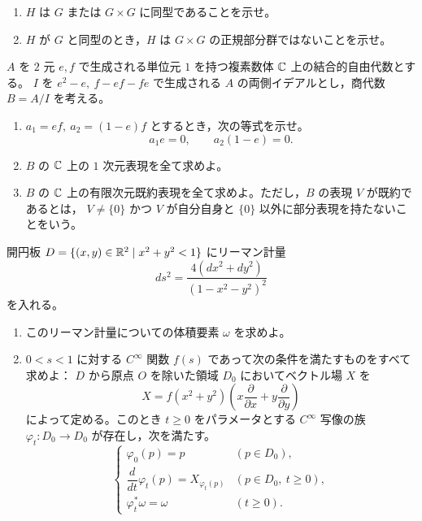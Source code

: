 \begin{enumerate}
  \item \(H\) は \(G\) または \(G\times G\) に同型であることを示せ。
  \item \(H\) が \(G\) と同型のとき，\(H\) は \(G\times G\) の正規部分群ではないことを示せ。
\end{enumerate}


\(A\) を \(2\) 元 \(e,f\) で生成される単位元 \(1\) を持つ複素数体 \(\mathbb{C}\) 上の結合的自由代数とする。
\(I\) を \(e^2-e,\ f-ef-fe\) で生成される \(A\) の両側イデアルとし，商代数 \(B=A/I\) を考える。

\begin{enumerate}
  \item \(a_1=ef,\ a_2=(1-e)f\) とするとき，次の等式を示せ。
  \[
    a_1e=0,\qquad a_2(1-e)=0.
  \]
  \item \(B\) の \(\mathbb{C}\) 上の \(1\) 次元表現を全て求めよ。
  \item \(B\) の \(\mathbb{C}\) 上の有限次元既約表現を全て求めよ。ただし，\(B\) の表現 \(V\) が既約であるとは，
  \(V\ne\{0\}\) かつ \(V\) が自分自身と \(\{0\}\) 以外に部分表現を持たないことをいう。
\end{enumerate}


開円板 \(D=\{(x,y)\in\mathbb{R}^2\mid x^2+y^2<1\}\) にリーマン計量
\[
  ds^2=\frac{4(dx^2+dy^2)}{(1-x^2-y^2)^2}
\]
を入れる。

\begin{enumerate}
  \item このリーマン計量についての体積要素 \(\omega\) を求めよ。
  \item \(0<s<1\) に対する \(C^\infty\) 関数 \(f(s)\) であって次の条件を満たすものをすべて求めよ：
  \(D\) から原点 \(O\) を除いた領域 \(D_0\) においてベクトル場 \(X\) を
  \[
    X=f(x^2+y^2)\left(x\frac{\partial}{\partial x}+y\frac{\partial}{\partial y}\right)
  \]
  によって定める。このとき \(t\ge0\) をパラメータとする \(C^\infty\) 写像の族
  \(\varphi_t:D_0\to D_0\) が存在し，次を満たす。
  \[
  \begin{cases}
    \varphi_0(p)=p & (p\in D_0),\\
    \dfrac{d}{dt}\varphi_t(p)=X_{\varphi_t(p)} & (p\in D_0,\ t\ge0),\\
    \varphi_t^*\omega=\omega & (t\ge0).
  \end{cases}
  \]
\end{enumerate}


